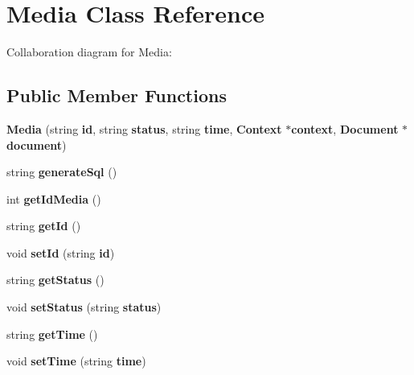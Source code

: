\section{Media Class Reference}
\label{classbr_1_1ufscar_1_1lince_1_1ginga_1_1recommender_1_1Media}
Collaboration diagram for Media:\subsection*{Public Member Functions}
\begin{CompactItemize}
\item 
\textbf{Media} (string {\bf id}, string {\bf status}, string {\bf time}, {\bf Context} $\ast${\bf context}, {\bf Document} $\ast${\bf document})\label{classbr_1_1ufscar_1_1lince_1_1ginga_1_1recommender_1_1Media_e33c0bc4e9fcdbd90e4f7e3fef84a7be}

\item 
string \textbf{generateSql} ()\label{classbr_1_1ufscar_1_1lince_1_1ginga_1_1recommender_1_1Media_8f1e45f781da9a5727416350efd7d586}

\item 
int \textbf{getIdMedia} ()\label{classbr_1_1ufscar_1_1lince_1_1ginga_1_1recommender_1_1Media_c8140a2d186c7df6d045b6a4da30935c}

\item 
string \textbf{getId} ()\label{classbr_1_1ufscar_1_1lince_1_1ginga_1_1recommender_1_1Media_bba5652b12c4d6161f860eb44d5789d8}

\item 
void \textbf{setId} (string {\bf id})\label{classbr_1_1ufscar_1_1lince_1_1ginga_1_1recommender_1_1Media_09363425ca175437f0ec328d404ab88a}

\item 
string \textbf{getStatus} ()\label{classbr_1_1ufscar_1_1lince_1_1ginga_1_1recommender_1_1Media_98f764590f61833475a749b9e6ad825b}

\item 
void \textbf{setStatus} (string {\bf status})\label{classbr_1_1ufscar_1_1lince_1_1ginga_1_1recommender_1_1Media_76551a84617b64092494b67805f56f83}

\item 
string \textbf{getTime} ()\label{classbr_1_1ufscar_1_1lince_1_1ginga_1_1recommender_1_1Media_4913b5d6d98757fe7a98730bf204dc90}

\item 
void \textbf{setTime} (string {\bf time})\label{classbr_1_1ufscar_1_1lince_1_1ginga_1_1recommender_1_1Media_a913ee56644e379b7f5726432cf2e78f}


\end{CompactItemize}
